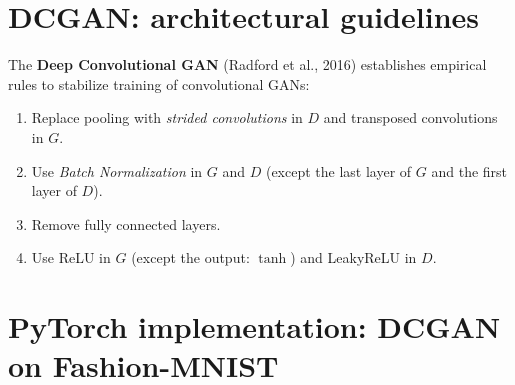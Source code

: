 \section{DCGAN: architectural guidelines}
\label{sec:dcgan}

The \textbf{Deep Convolutional GAN} (Radford et al., 2016) establishes empirical rules to stabilize training of convolutional GANs:

\begin{bestpractice}
\begin{enumerate}
    \item Replace pooling with \emph{strided convolutions} in $D$ and transposed convolutions in $G$.
    \item Use \emph{Batch Normalization} in $G$ and $D$ (except the last layer of $G$ and the first layer of $D$).
    \item Remove fully connected layers.
    \item Use ReLU in $G$ (except the output: $\tanh$) and LeakyReLU in $D$.
\end{enumerate}
\end{bestpractice}

\section{PyTorch implementation: DCGAN on Fashion-MNIST}
\label{sec:dcgan-pytorch}

